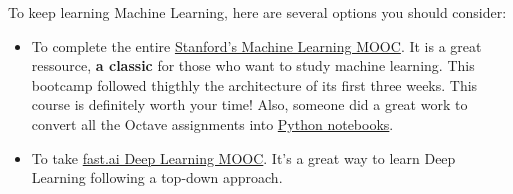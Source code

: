 \documentclass[]{article}
\begin{document}
To keep learning Machine Learning, here are several options you should
consider:

\begin{itemize}
\item
  To complete the entire
  \href{https://www.coursera.org/learn/machine-learning/home/}{Stanford's
  Machine Learning MOOC}. It is a great ressource, \textbf{a classic}
  for those who want to study machine learning. This bootcamp followed
  thigthly the architecture of its first three weeks. This course is
  definitely worth your time! Also, someone did a great work to convert
  all the Octave assignments into
  \href{https://github.com/dibgerge/ml-coursera-python-assignments}{Python
  notebooks}.
\item
  To take \href{https://course.fast.ai/}{fast.ai Deep Learning MOOC}.
  It's a great way to learn Deep Learning following a top-down approach.
  \clearpage
\end{itemize}
\end{document}
